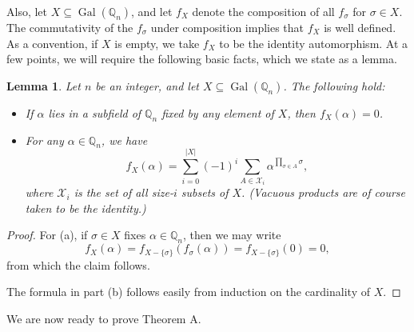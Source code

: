 \documentclass[12pt]{amsart}
\newtheorem{lemma}[theorem]{Lemma}
\theoremstyle{definition}
\newcommand{\Q}{\mathbb{Q}}
\DeclareMathOperator{\Gal}{Gal}
\begin{document}
Also, let $X \subseteq \Gal(\Q_n)$, and let $f_X$ denote the composition of all $f_\sigma$ for $\sigma \in X$. The commutativity of the $f_\sigma$ under composition implies that $f_X$ is well defined.  As a convention, if $X$ is empty, we take $f_X$ to be the identity automorphism. At a few points, we will require the following basic facts, which we state as a lemma.
\begin{lemma}
	Let $n$ be an integer, and let $X \subseteq \Gal(\Q_n)$. The following hold:
	\begin{itemize}
		\item[(a).] If $\alpha$ lies in a subfield of $\Q_n$ fixed by any element of $X$, then $f_X(\alpha) = 0$.
		\item[(b).] For any $\alpha \in \Q_n$, we have
		$$
		f_X(\alpha) = \sum_{i=0}^{|X|} (-1)^i\sum_{A \in \mathscr{X}_i}\alpha^{\prod_{\sigma \in A}\sigma}, 
		$$
		where $\mathscr{X}_i$ is the set of all size-$i$ subsets of $X$. (Vacuous products are of course taken to be the identity.)
	\end{itemize}
\end{lemma}
\begin{proof}
	For (a), if $\sigma \in X$ fixes $\alpha \in \Q_n$, then we may write 
	$$
		f_X(\alpha) = f_{X - \{\sigma\}}(f_\sigma(\alpha) ) = f_{X - \{\sigma\}}(0) = 0,
	$$
	from which the claim follows.
	
	The formula in part (b) follows easily from induction on the cardinality of $X$.
\end{proof} 

We are now ready to prove Theorem A.
\end{document}
